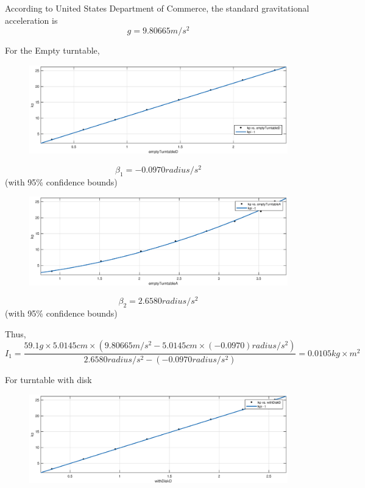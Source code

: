According to  United States Department of Commerce, the standard gravitational
acceleration is 
$$ g =  9.80665 m/s^2 $$


For the Empty turntable,
\newcommand{\EFWwr}{17cm}
\begin{figure}[H]
\centering
\includegraphics[width=\EFWwr]{matlab/etd}
\end{figure}

$$ \beta_1 = -0.0970 radius/s^2$$ (with 95\% confidence bounds) 

\begin{figure}[H]
\centering
\includegraphics[width=\EFWwr]{matlab/eta}
\end{figure}

$$ \beta_2 = 2.6580 radius/s^2$$ (with 95\% confidence bounds) 

Thus,
$$ I_1 = \frac{59.1 g \times 5.0145 cm \times (9.80665 m/s^2 - 5.0145 cm \times (-0.0970) radius/s^2 )}{2.6580 radius/s^2 -(-0.0970 radius/s^2) } = 0.0105 kg\times m^2 $$

For turntable with disk 
\begin{figure}[H]
\centering
\includegraphics[width=\EFWwr]{matlab/wdd}
\end{figure}

